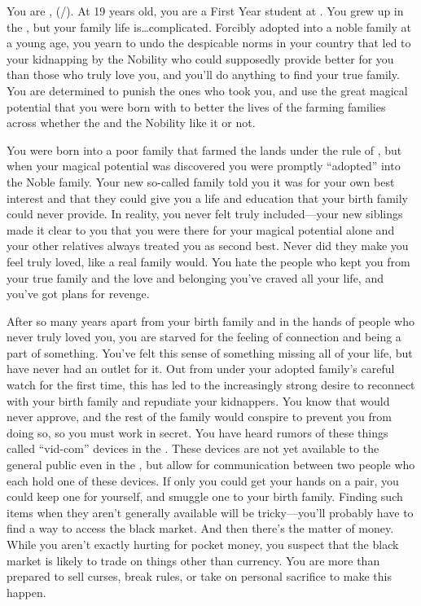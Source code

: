 \documentclass[char]{GL2020}
\begin{document}
\name{\cAdopted{}}

You are \cAdopted{\full}, (\cAdopted{\they}/\cAdopted{\them}).  At 19 years old, you are a First Year student at \pSchool{}.  You grew up in the \pFarm{}, but your family life is\ldots{}complicated.  Forcibly adopted into a noble family at a young age, you yearn to undo the despicable norms in your country that led to your kidnapping by the Nobility who could supposedly provide better for you than those who truly love you, and you'll do anything to find your true family. You are determined to punish the ones who took you, and use the great magical potential that you were born with to better the lives of the farming families across \pFarm{} whether the \cQueen{\Majesty} and the Nobility like it or not.

You were born into a poor family that farmed the lands under the rule of \cAdoptedParentOne{\full}, but when your magical potential was discovered you were promptly ``adopted'' into the Noble \cAdoptedParentOne{\formal} family. Your new so-called family told you it was for your own best interest and that they could give you a life and education that your birth family could never provide.  In reality, you never felt truly included---your new siblings made it clear to you that you were there for your magical potential alone and your other relatives always treated you as second best. Never did they make you feel truly loved, like a real family would. You hate the people who kept you from your true family and the love and belonging you've craved all your life, and you've got plans for revenge.  

After so many years apart from your birth family and in the hands of people who never truly loved you, you are starved for the feeling of connection and being a part of something. You've felt this sense of something missing all of your life, but have never had an outlet for it. Out from under your adopted family's careful watch for the first time, this has led to the increasingly strong desire to reconnect with your birth family and repudiate your kidnappers. You know that \cAdoptedParentOne{} would never approve, and the rest of the family would conspire to prevent you from doing so, so you must work in secret. You have heard rumors of these things called ``vid-com'' devices in the \pTech{}. These devices are not yet available to the general public even in the \pTech{}, but allow for communication between two people who each hold one of these devices. If only you could get your hands on a pair, you could keep one for yourself, and smuggle one to your birth family. Finding such items when they aren't generally available will be tricky---you'll probably have to find a way to access the black market. And then there's the matter of money. While you aren't exactly hurting for pocket money, you suspect that the black market is likely to trade on things other than \pFarm{} currency. You are more than prepared to sell curses, break rules, or take on personal sacrifice to make this happen.
\end{document}

